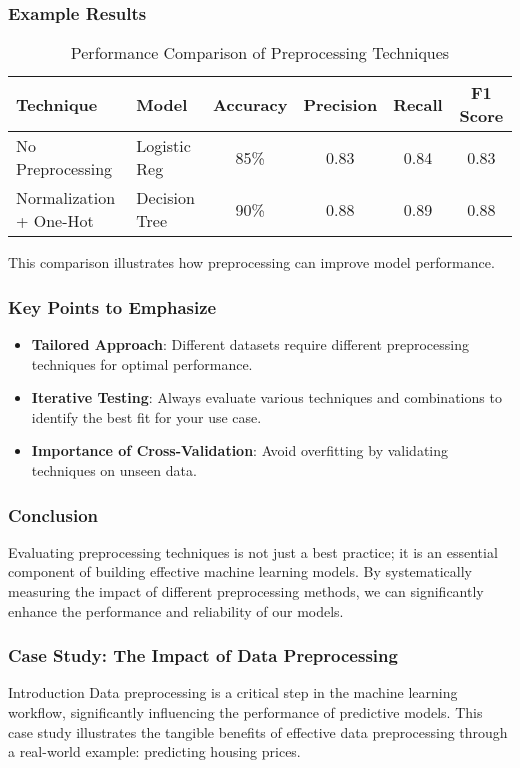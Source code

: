 \documentclass[aspectratio=169]{beamer}
\begin{document}
\begin{frame}[fragile]
    \frametitle{Example Results}
    \begin{table}[ht]
        \centering
        \begin{tabular}{|l|l|c|c|c|c|}
            \hline
            \textbf{Technique} & \textbf{Model} & \textbf{Accuracy} & \textbf{Precision} & \textbf{Recall} & \textbf{F1 Score} \\
            \hline
            No Preprocessing & Logistic Reg & 85\% & 0.83 & 0.84 & 0.83 \\
            Normalization + One-Hot & Decision Tree & 90\% & 0.88 & 0.89 & 0.88 \\
            \hline
        \end{tabular}
        \caption{Performance Comparison of Preprocessing Techniques}
    \end{table}
    This comparison illustrates how preprocessing can improve model performance.
\end{frame}

\begin{frame}[fragile]
    \frametitle{Key Points to Emphasize}
    \begin{itemize}
        \item \textbf{Tailored Approach}: Different datasets require different preprocessing techniques for optimal performance.
        \item \textbf{Iterative Testing}: Always evaluate various techniques and combinations to identify the best fit for your use case.
        \item \textbf{Importance of Cross-Validation}: Avoid overfitting by validating techniques on unseen data.
    \end{itemize}
\end{frame}

\begin{frame}[fragile]
    \frametitle{Conclusion}
    Evaluating preprocessing techniques is not just a best practice; it is an essential component of building effective machine learning models. 
    By systematically measuring the impact of different preprocessing methods, we can significantly enhance the performance and reliability of our models.
\end{frame}

\begin{frame}[fragile]
    \frametitle{Case Study: The Impact of Data Preprocessing}
    \begin{block}{Introduction}
        Data preprocessing is a critical step in the machine learning workflow, significantly influencing the performance of predictive models. 
        This case study illustrates the tangible benefits of effective data preprocessing through a real-world example: predicting housing prices.
    \end{block}
\end{frame}
\end{document}
